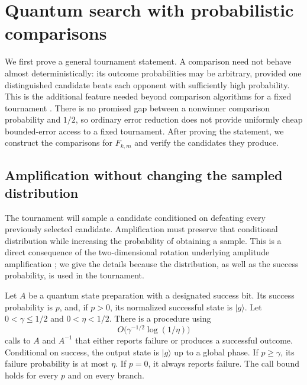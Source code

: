 \section{Quantum search with probabilistic comparisons}\label{sec:quantum}

We first prove a general tournament statement. A comparison need not
behave almost deterministically: its outcome probabilities may be
arbitrary, provided one distinguished candidate beats each opponent
with sufficiently high probability. This is the additional feature needed
beyond comparison algorithms for a fixed tournament
\cite{SYZ04,MPS23,BK26}. There is no promised gap between a nonwinner
comparison probability and $1/2$, so ordinary error reduction does not
provide uniformly cheap bounded-error access to a fixed tournament.
After proving the statement, we
construct the comparisons for $F_{k,m}$ and verify the candidates they
produce.

\subsection{Amplification without changing the sampled distribution}

The tournament will sample a candidate conditioned on defeating every
previously selected candidate. Amplification must preserve that
conditional distribution while increasing the probability of obtaining
a sample. This is a direct consequence of the
two-dimensional rotation underlying amplitude amplification
\cite{BBHT98,BHMT02}; we give the details because the distribution,
as well as the success probability, is used in the tournament.

\begin{lemma}\label{lem:amplification}
Let $A$ be a quantum state preparation with a designated success bit.
Its success probability is $p$, and, if $p>0$, its normalized successful
state is $\lvert g\rangle$. Let $0<\gamma\le1/2$ and $0<\eta<1/2$.
There is a procedure using
\[
 O\bigl(\gamma^{-1/2}\log(1/\eta)\bigr)
\]
calls to $A$ and $A^{-1}$ that either reports failure or produces a
successful outcome. Conditional on success, the output state is
$\lvert g\rangle$ up to a global phase. If $p\ge\gamma$, its failure
probability is at most $\eta$. If $p=0$, it always reports failure.
The call bound holds for every $p$ and on every branch.
\end{lemma}

